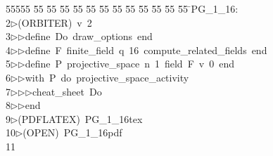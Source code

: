 %
%
\begin{tabbing}
55555 \= 55 \= 55 \= 55 \= 55 \= 55 \= 55 \= 55 \= 55 \= 55 \= 55 \= 55 \= 55 \= \>PG\_1\_16:\\[0pt]
2\>$\triangleright$\>(ORBITER)\ v\ 2\ \\[0pt]
3\>$\triangleright$\>$\triangleright$\>define\ Do\ draw\_options\ end\ \\[0pt]
4\>$\triangleright$\>$\triangleright$\>define\ F\ finite\_field\ q\ 16\ compute\_related\_fields\ end\ \\[0pt]
5\>$\triangleright$\>$\triangleright$\>define\ P\ projective\_space\ n\ 1\ field\ F\ v\ 0\ end\ \\[0pt]
6\>$\triangleright$\>$\triangleright$\>with\ P\ do\ projective\_space\_activity\ \\[0pt]
7\>$\triangleright$\>$\triangleright$\>$\triangleright$\>cheat\_sheet\ Do\ \\[0pt]
8\>$\triangleright$\>$\triangleright$\>end\\[0pt]
9\>$\triangleright$\>(PDFLATEX)\ PG\_1\_16tex\ \\[0pt]
10\>$\triangleright$\>(OPEN)\ PG\_1\_16pdf\\[0pt]
11\>\end{tabbing}
